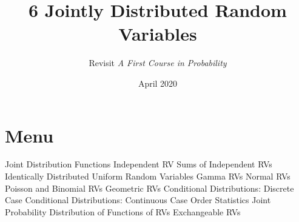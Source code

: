 \documentclass{article}
\title{6 Jointly Distributed Random Variables}
\author{Revisit \emph{A First Course in Probability}}
\date{April 2020}
\begin{document}
\maketitle

\section*{Menu}
\begin{outline}[enumerate]
    \1  Joint Distribution Functions 
    \1  Independent RV
    \1  Sums of Independent RVs
        \2 Identically Distributed Uniform Random Variables
        \2 Gamma RVs
        \2 Normal RVs
        \2 Poisson and Binomial RVs
        \2 Geometric RVs
    \1  Conditional Distributions: Discrete Case 
    \1  Conditional Distributions: Continuous Case 
    \1  Order Statistics
    \1  Joint Probability Distribution of Functions of RVs
    \1  Exchangeable RVs
\end{outline}
\end{document}

